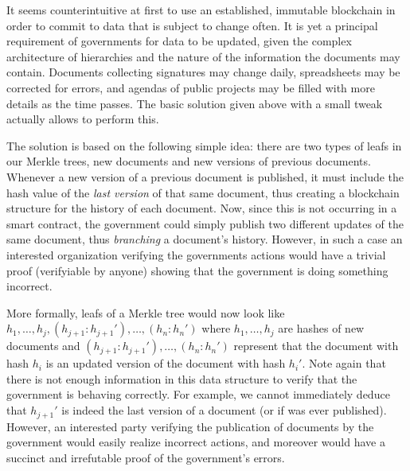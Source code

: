 
It seems counterintuitive at first to use an established, immutable blockchain in order to commit to data that is subject to change often. It is yet a principal requirement of governments for data to be updated, given the complex architecture of hierarchies and the nature of the information the documents may contain. Documents collecting signatures may change daily, spreadsheets may be corrected for errors, and agendas of public projects may be filled with more details as the time passes. The basic solution given above with a small tweak actually allows to perform this.

The solution is based on the following simple idea: there are two types of leafs in our Merkle trees, new documents and new versions of previous documents. Whenever a new version of a previous document is published, it must include the hash value of the \emph{last version} of that same document, thus creating a blockchain structure for the history of each document. Now, since this is not occurring in a smart contract, the government could simply publish two different updates of the same document, thus \emph{branching} a document's history. However, in such a case an interested organization verifying the governments actions would have a trivial proof (verifyiable by anyone) showing that the government is doing something incorrect.

More formally, leafs of a Merkle tree would now look like $h_1,\ldots,h_j,(h_{j+1}:h_{j+1}'), \ldots,(h_n:h_n')$ where $h_1,\ldots,h_j$ are hashes of new documents and $(h_{j+1}:h_{j+1}'), \ldots,(h_n:h_n')$ represent that the document with hash $h_{i}$ is an updated version of the document with hash $h_{i}'$. Note again that there is not enough information in this data structure to verify that the government is behaving correctly. For example, we cannot immediately deduce that $h_{j+1}'$ is indeed the last version of a document (or if was ever published). However, an interested party verifying the publication of documents by the government would easily realize incorrect actions, and moreover would have a succinct and irrefutable proof of the government's errors.

